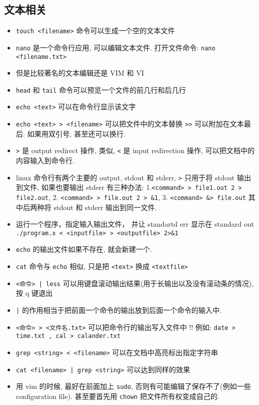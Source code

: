 \subsection{文本相关}
\begin{itemize}
\item \verb`touch <filename>` 命令可以生成一个空的文本文件
\item \verb`nano` 是一个命令行应用, 可以编辑文本文件. 打开文件命令: \verb`nano <filename.txt>`
\item 但是比较著名的文本编辑还是 VIM 和 VI 
\item \verb`head` 和 \verb`tail` 命令可以预览一个文件的前几行和后几行
\item \verb`echo <text>` 可以在命令行显示该文字
\item \verb`echo <text> > <filename>` 可以把文件中的文本替换 \verb`>>` 可以附加在文本最后. 如果用双引号, 甚至还可以换行.
\item \verb`>` 是 output redirect 操作, 类似, \verb`<` 是 input redirection 操作, 可以把文档中的内容输入到命令行.
\item linux 命令行有两个主要的 output, stdout 和 stderr, \verb`>` 只用于将 stdout 输出到文件, 如果也要输出 stderr 有三种办法: 1.\verb`<command> > file1.out 2 > file2.out`, 2. \verb`<command> > file.out 2 > &1`, 3. \verb`<command> &> file.out` 其中后两种将 stdout 和 stderr 输出到同一文件.
\item 运行一个程序，指定输入输出文件， 并让 standartd err 显示在 standard out \verb`./program.x < <inputfile> > <outputfile> 2>&1` 
\item \verb`echo` 的输出文件如果不存在, 就会新建一个.
\item \verb`cat` 命令与 \verb`echo` 相似, 只是把 \verb`<text>` 换成 \verb`<textfile>`
\item \verb`<命令> | less` 可以用键盘滚动输出结果(用于长输出以及没有滚动条的情况), 按 q 键退出
\item \verb`|` 的作用相当于把前面一个命令的输出放到后面一个命令的输入中.
\item \verb`<命令> > <文件名.txt>` 可以把命令行的输出写入文件中 !! 例如: \verb`date > time.txt , cal > calander.txt`
\item \verb`grep <string> < <filename>` 可以在文档中高亮标出指定字符串
\item \verb`cat <filename> | grep <string>` 可以达到同样的效果
\item 用 vim 的时候, 最好在前面加上 \verb`sudo`, 否则有可能编辑了保存不了(例如一些 configuration file). 甚至要首先用 \verb`chown` 把文件所有权变成自己的.

\end{itemize}
